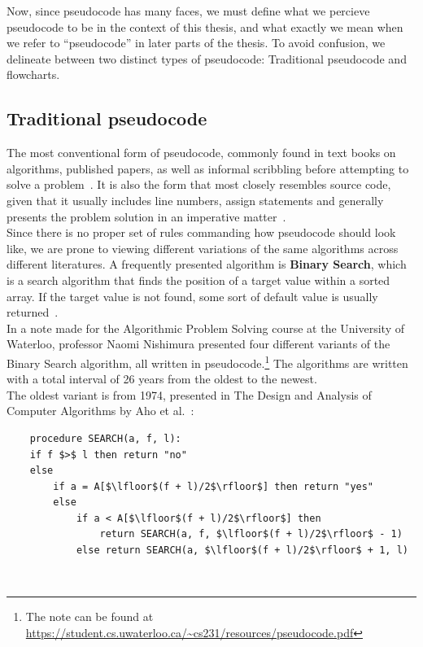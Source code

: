 Now, since pseudocode has many faces, we must define what we percieve pseudocode to be in the context of this thesis, and what exactly we mean when we refer to ``pseudocode'' in later parts of the thesis. To avoid confusion, we delineate between two distinct types of pseudocode: Traditional pseudocode and flowcharts.

\subsection{Traditional pseudocode}

The most conventional form of pseudocode, commonly found in text books on algorithms, published papers, as well as informal scribbling before attempting to solve a problem~\cite{payAttentionToMLPs, BOOK:intro/Cormen/Leiserson}. It is also the form that most closely resembles source code, given that it usually includes line numbers, assign statements and generally presents the problem solution in an imperative matter~\cite{proposalForParadigmGeneralPseudocode}. \hfill \\

Since there is no proper set of rules commanding how pseudocode should look like, we are prone to viewing different variations of the same algorithms across different literatures. A frequently presented algorithm is \textbf{Binary Search}, which is a search algorithm that finds the position of a target value within a sorted array. If the target value is not found, some sort of default value is usually returned~\cite{BOOK:intro/Cormen/Leiserson}. \hfill \\

In a note made for the Algorithmic Problem Solving course at the University of Waterloo, professor Naomi Nishimura presented four different variants of the Binary Search algorithm, all written in pseudocode.\footnote{The note can be found at \url{https://student.cs.uwaterloo.ca/~cs231/resources/pseudocode.pdf}} The algorithms are written with a total interval of 26 years from the oldest to the newest. \hfill \\

The oldest variant is from 1974, presented in The Design and Analysis of Computer Algorithms by Aho et al.~\cite[139]{BOOK:DesignAnalysis/Aho}: \hfill \\

\begin{lstlisting}
    procedure SEARCH(a, f, l):
    if f $>$ l then return "no"
    else
        if a = A[$\lfloor$(f + l)/2$\rfloor$] then return "yes"
        else
            if a < A[$\lfloor$(f + l)/2$\rfloor$] then
                return SEARCH(a, f, $\lfloor$(f + l)/2$\rfloor$ - 1)
            else return SEARCH(a, $\lfloor$(f + l)/2$\rfloor$ + 1, l)
\end{lstlisting} \hfill \\

